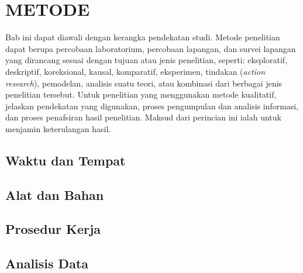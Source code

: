 
\chapter{METODE}

Bab ini dapat diawali dengan kerangka pendekatan studi.
Metode penelitian dapat berupa percobaan laboratorium, percobaan lapangan,
dan survei lapangan yang dirancang sesuai dengan tujuan atau jenis penelitian,
seperti: eksploratif, deskriptif, koreksional, kausal, komparatif, eksperimen,
tindakan (\textit{action research}), pemodelan, analisis suatu teori, atau
kombinasi dari berbagai jenis penelitian tersebut.
Untuk penelitian yang menggunakan metode kualitatif, jelaskan pendekatan yang
digunakan, proses pengumpulan dan analisis informasi, dan proses penafsiran
hasil penelitian.
Maksud dari perincian ini ialah untuk menjamin keterulangan hasil.


\section{Waktu dan Tempat}

\section{Alat dan Bahan}

\section{Prosedur Kerja}

\section{Analisis Data}

